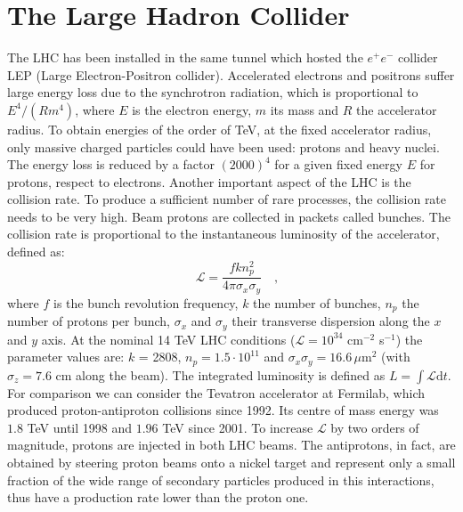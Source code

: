 \section{The Large Hadron Collider}
The LHC has been installed in the same tunnel which hosted the $e^+e^-$ collider
LEP (Large Electron-Positron collider). Accelerated electrons and positrons suffer large
energy loss due to the synchrotron radiation, which is proportional to $E^4/(Rm^4)$,
where $E$ is the electron energy, $m$ its mass and $R$ the accelerator radius. To
obtain energies of the order of TeV, at the fixed accelerator radius, only massive
charged particles could have been used: protons and heavy nuclei. The energy loss
is reduced by a factor $(2000)^4$ for a given fixed energy $E$ for protons, respect to electrons.
Another important aspect of the LHC is the collision rate. To produce a sufficient
number of rare processes, the collision rate needs to be very high. Beam protons
are collected in packets called bunches. The collision rate is proportional to the
instantaneous luminosity of the accelerator, defined as:
\begin{displaymath}\quad
\mathcal{L}=\frac{fkn^2_p}{4\pi\sigma_x\sigma_y} \quad,
\end{displaymath}
where $f$ is the bunch revolution frequency, $k$ the number of bunches, $n_p$ the number
 of protons per bunch, $\sigma_x$ and $\sigma_y$ their transverse dispersion along the $x$ and $y$
axis. At the nominal 14 TeV LHC conditions ($\mathcal{L} = 10^{34}$ cm$^{-2}$ s$^{-1}$) the parameter
values are: $k$ = 2808, $n_p=1.5\cdot10^{11}$ and $\sigma_x\sigma_y = 16.6\,\mu\mathrm{m}^2$ (with $\sigma_z = 7.6$ cm along
the beam). The integrated luminosity is defined as $L =\int\mathcal{L}\mathrm{d}t$. For comparison
we can consider the Tevatron accelerator at Fermilab, which produced proton-antiproton
collisions since 1992. Its centre of mass energy was $1.8$ TeV until 1998 and $1.96$ TeV
since 2001. To increase $\mathcal{L}$ by two orders of magnitude, protons are injected in both
LHC beams. The antiprotons, in fact, are obtained by steering
proton beams onto a nickel target and represent only a small fraction of the wide
range of secondary particles produced in this interactions, thus have a production rate lower than the proton one.
\\

